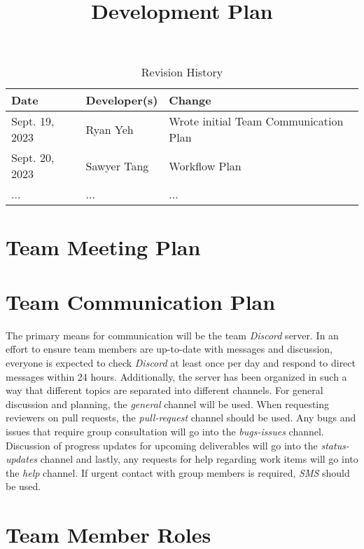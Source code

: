 \documentclass{article}
\title{Development Plan\\\progname}
\author{\authname}
\date{}
\begin{document}
\maketitle

\begin{table}[hp]
\caption{Revision History} \label{TblRevisionHistory}
\begin{tabularx}{\textwidth}{llX}
\toprule
\textbf{Date} & \textbf{Developer(s)} & \textbf{Change}\\
\midrule
Sept. 19, 2023 & Ryan Yeh & Wrote initial Team Communication Plan\\
Sept. 20, 2023 & Sawyer Tang & Workflow Plan\\
... & ... & ...\\
\bottomrule
\end{tabularx}
\end{table}


\section{Team Meeting Plan}

\section{Team Communication Plan}

The primary means for communication will be the team \emph{Discord} server. In an effort to 
ensure team members are up-to-date with messages and discussion, everyone is expected to check \emph{Discord}
at least once per day and respond to direct messages within 24 hours.
Additionally, the server has been organized in such a way that different topics are separated into different channels. 
For general  discussion and planning, the \emph{general} channel will be used. When requesting reviewers on pull requests, 
the \emph{pull-request} channel should be used. Any bugs and issues that require group consultation will go 
into the \emph{bugs-issues} channel. Discussion of progress updates for upcoming deliverables will go into the
\emph{status-updates} channel and lastly, any requests for help regarding work items will go into the \emph{help} channel.
If urgent contact with group members is required, \emph{SMS} should be used.

\section{Team Member Roles}
\end{document}
